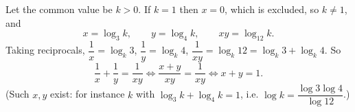 Let the common value be $k>0$. If $k=1$ then $x=0$, which is excluded, so $k\ne1$, and
\[
x=\log_3k,\qquad y=\log_4k,\qquad xy=\log_{12}k .
\]
Taking reciprocals, $\dfrac{1}{x}=\log_k3$, $\dfrac{1}{y}=\log_k4$, $\dfrac{1}{xy}=\log_k12=\log_k3+\log_k4$. So
\[
\dfrac{1}{x}+\dfrac{1}{y}=\dfrac{1}{xy}\iff\dfrac{x+y}{xy}=\dfrac{1}{xy}\iff x+y=\boxed{1}.
\]
(Such $x,y$ exist: for instance $k$ with $\log_3k+\log_4k=1$, i.e. $\log k=\dfrac{\log 3\log 4}{\log 12}$.)
